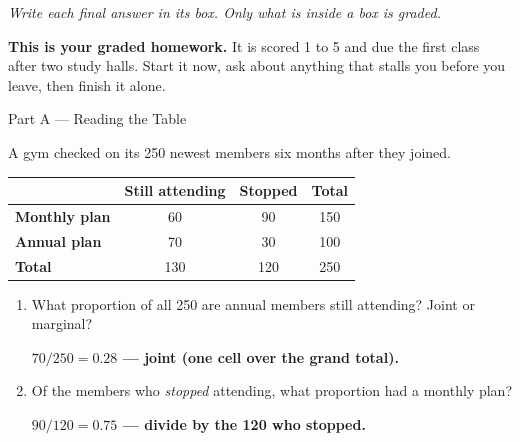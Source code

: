 \documentclass[12pt]{article}
\newcommand{\answerspace}[2]{\par\nopagebreak\noindent\begin{minipage}[t][#1][t]{\linewidth}%
  \color{keyred}\bfseries #2\end{minipage}\par}
\begin{document}
{\small\itshape Write each final answer in its box. Only what is inside a box is graded.}\par

\vspace{0.06in}

\boxguard[8]
\begin{remindbox}
\small
\textbf{This is your graded homework.} It is scored 1 to 5 and due the first class after two study
halls. Start it now, ask about anything that stalls you before you leave, then finish it alone.
\end{remindbox}

\vspace{0.04in}

\boxguard[20]
\begin{notesbox}{Part A --- Reading the Table}
\small
\begin{minipage}[c]{0.34\linewidth}\raggedright
A gym checked on its 250 newest members six months after they joined.
\end{minipage}\hfill
\begin{minipage}[c]{0.64\linewidth}
\centering
\renewcommand{\arraystretch}{1.1}
\begin{tabular}{@{} l | c c | c @{}}
 & \textbf{Still attending} & \textbf{Stopped} & \textbf{Total} \\ \hline
\textbf{Monthly plan} & 60 & 90 & 150 \\
\textbf{Annual plan} & 70 & 30 & 100 \\ \hline
\textbf{Total} & 130 & 120 & 250 \\
\end{tabular}
\end{minipage}
\vspace{2pt}
\begin{enumerate}[leftmargin=1.9em, itemsep=2pt]
  \item What proportion of all 250 are annual members still attending? Joint or marginal?
        \answerspace{0.7cm}{$70/250 = 0.28$ --- joint (one cell over the grand total).}
  \item Of the members who \emph{stopped} attending, what proportion had a monthly plan?\gradedbelow[r]{5pt}{\gradedblank[id=hw2, type=short, points=1, answer=0.75, check=numeric, tolerance=0.005]{0.7in}{0.2in}}
        \answerspace{0.7cm}{$90/120 = 0.75$ --- divide by the 120 who stopped.}
\end{enumerate}
\end{notesbox}
\end{document}
